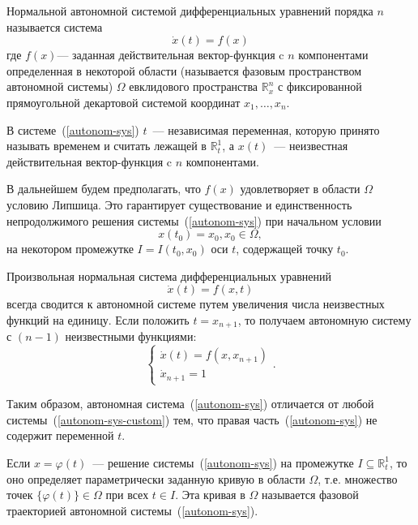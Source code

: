 \setcounter{equation}{0}
Нормальной автономной системой дифференциальных уравнений порядка $n$ называется система
\begin{equation}\label{autonom-sys}
    \dot{x}(t) = f(x)
\end{equation}
где $f(x)$— заданная действительная вектор-функция c $n$ компонентами определенная в некоторой области (называется фазовым пространством автономной системы) $\Omega$ евклидового пространства $\mathbb{R}_x^n$ с
фиксированной прямоугольной декартовой системой координат $x_1, \ldots, x_n$.

В системе~(\ref{autonom-sys}) $t$~--- независимая переменная, которую принято называть временем и считать лежащей в $\mathbb{R}_t^1$, а $x(t)$~--- неизвестная действительная вектор-функция c $n$ компонентами.

В дальнейшем будем предполагать, что $f(x)$ удовлетворяет в области $\Omega$ условию Липшица. Это гарантирует существование и единственность непродолжимого решения системы~(\ref{autonom-sys}) при начальном условии
\begin{equation}\label{autonom-sys-condition}
    x(t_0) = x_0, x_0 \in \Omega,
\end{equation}
на некотором промежутке $I = I(t_0, x_0)$ оси $t$, содержащей точку $t_0$.

Произвольная нормальная система дифференциальных уравнений
\begin{equation}\label{autonom-sys-custom}
    \dot{x}(t) = f(x, t)
\end{equation}
всегда сводится к автономной системе путем увеличения числа неизвестных функций на единицу. Если положить \(t = x_{n + 1}\), то получаем автономную систему с \((n - 1)\) неизвестными функциями:
\[
 \begin{cases}
 \dot{x}(t) = f(x, x_{n + 1})\\
 \dot{x}_{n+1} = 1
 \end{cases}.
\]

Таким образом, автономная система~(\ref{autonom-sys}) отличается от любой системы~(\ref{autonom-sys-custom}) тем, что правая часть~(\ref{autonom-sys}) не содержит переменной $t$.

\begin{definition}
Если \(x = \varphi(t)\)~--- решение системы~(\ref{autonom-sys}) на промежутке \(I \subseteq \mathbb{R}_t^1\), то оно определяет параметрически заданную кривую в области $\Omega$, т.е. множество точек \(\{\varphi(t)\} \in \Omega\) при всех \(t \in I\). Эта кривая в $\Omega$ называется фазовой траекторией автономной системы~(\ref{autonom-sys}).
\end{definition}

